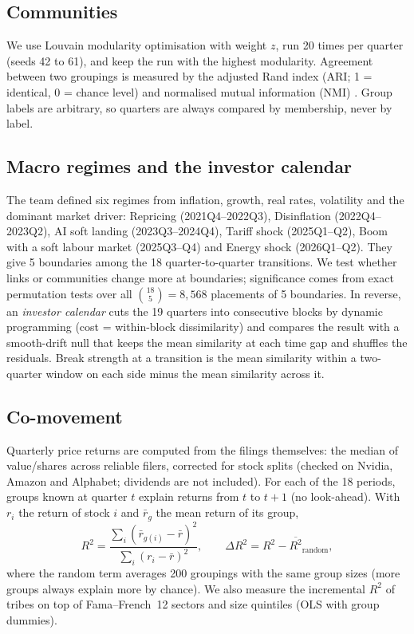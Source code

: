 \documentclass[10pt,a4paper]{article}
\begin{document}
\subsection{Communities}
We use Louvain modularity optimisation \cite{blondel2008,newman2006} with weight $z$, run 20 times per quarter (seeds 42 to 61), and keep the run with the highest modularity. Agreement between two groupings is measured by the adjusted Rand index (ARI; 1 = identical, 0 = chance level) \cite{hubert1985} and normalised mutual information (NMI) \cite{strehl2002}. Group labels are arbitrary, so quarters are always compared by membership, never by label.

\subsection{Macro regimes and the investor calendar}
The team defined six regimes from inflation, growth, real rates, volatility and the dominant market driver: Repricing (2021Q4--2022Q3), Disinflation (2022Q4--2023Q2), AI soft landing (2023Q3--2024Q4), Tariff shock (2025Q1--Q2), Boom with a soft labour market (2025Q3--Q4) and Energy shock (2026Q1--Q2). They give 5 boundaries among the 18 quarter-to-quarter transitions. We test whether links or communities change more at boundaries; significance comes from exact permutation tests over all $\binom{18}{5}=8{,}568$ placements of 5 boundaries. In reverse, an \emph{investor calendar} cuts the 19 quarters into consecutive blocks by dynamic programming (cost = within-block dissimilarity) and compares the result with a smooth-drift null that keeps the mean similarity at each time gap and shuffles the residuals. Break strength at a transition is the mean similarity within a two-quarter window on each side minus the mean similarity across it.

\subsection{Co-movement}
Quarterly price returns are computed from the filings themselves: the median of value/shares across reliable filers, corrected for stock splits (checked on Nvidia, Amazon and Alphabet; dividends are not included). For each of the 18 periods, groups known at quarter $t$ explain returns from $t$ to $t+1$ (no look-ahead). With $r_i$ the return of stock $i$ and $\bar r_{g}$ the mean return of its group,
\begin{equation}
  R^2 = \frac{\sum_i \left(\bar r_{g(i)} - \bar r\right)^2}{\sum_i \left(r_i - \bar r\right)^2},
  \qquad
  \Delta R^2 = R^2 - \overline{R^2}_{\text{random}},
\end{equation}
where the random term averages 200 groupings with the same group sizes (more groups always explain more by chance). We also measure the incremental $R^2$ of tribes on top of Fama--French~12 sectors and size quintiles (OLS with group dummies).
\end{document}
